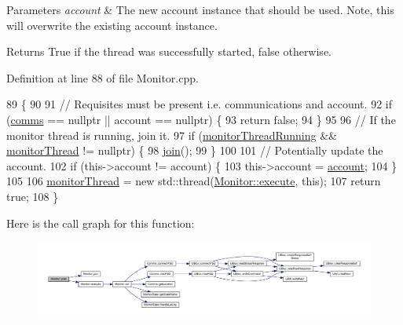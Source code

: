 \begin{DoxyParams}{Parameters}
{\em account} & The new account instance that should be used. Note, this will overwrite the existing account instance. \\
\hline
\end{DoxyParams}
\begin{DoxyReturn}{Returns}
True if the thread was successfully started, false otherwise. 
\end{DoxyReturn}


Definition at line 88 of file Monitor.\+cpp.


\begin{DoxyCode}
89 \{
90 
91     \textcolor{comment}{// Requisites must be present i.e. communications and account.}
92     \textcolor{keywordflow}{if} (\hyperlink{class_monitor_a42fffadeba33ae6080b1d95783ca703b}{comms} == \textcolor{keyword}{nullptr} || account == \textcolor{keyword}{nullptr}) \{
93         \textcolor{keywordflow}{return} \textcolor{keyword}{false};
94     \}
95 
96     \textcolor{comment}{// If the monitor thread is running, join it.}
97     \textcolor{keywordflow}{if} (\hyperlink{class_monitor_a63d26dffb146b9cfd0705163f3dc4745}{monitorThreadRunning} && \hyperlink{class_monitor_a1e6bfb7c47a223d8bdc537e2cff07822}{monitorThread} != \textcolor{keyword}{nullptr}) \{
98         \hyperlink{class_monitor_a2d2e309666c98333a317c9786f94f6ad}{join}();
99     \}
100 
101     \textcolor{comment}{// Potentially update the account.}
102     \textcolor{keywordflow}{if} (this->account != account) \{
103         this->account = \hyperlink{class_monitor_acacff99178fbcd9eae50801acc346bf4}{account};
104     \}
105 
106     \hyperlink{class_monitor_a1e6bfb7c47a223d8bdc537e2cff07822}{monitorThread} = \textcolor{keyword}{new} std::thread(\hyperlink{class_monitor_a79e0c78d0973bee48418aedf3aedb2ba}{Monitor::execute}, \textcolor{keyword}{this});
107     \textcolor{keywordflow}{return} \textcolor{keyword}{true};
108 \}
\end{DoxyCode}
Here is the call graph for this function\+:
\nopagebreak
\begin{figure}[H]
\begin{center}
\leavevmode
\includegraphics[width=350pt]{d9/df7/class_monitor_a5a01b1c1084f0826a01c184519491cf6_cgraph}
\end{center}
\end{figure}
\mbox{\label{class_monitor_a13fb20dc3bd5c8739f5a820cf7433cd8}} 
